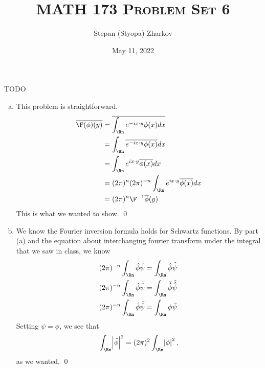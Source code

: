 \documentclass{article}
\title{\textsc{MATH 173 Problem Set 6}}
\author{Stepan (Styopa) Zharkov}
\date{May 11, 2022}
\begin{document}
\maketitle
{} TODO
 \tri
\hop 
\solution
\begin{enumerate}[(a)]
    \item This problem is straightforward. 
    \begin{align*}
        \ol{\F(\phi)(y)} &= \ol {\int_\Rn e^{-ix \cdot y}\phi(x)dx} \\
        &= \int_\Rn \ol {e^{-ix \cdot y}\phi(x)}dx \\
        &= \int_\Rn e^{ix \cdot y}\ol{\phi(x)}dx \\
        &= (2\pi)^n(2\pi)^{-n}\int_\Rn e^{ix \cdot y}\ol{\phi(x)}dx \\
        &= (2\pi)^n\F\inv\ol{\phi}(y) 
    \end{align*}
    This is what we wanted to show. \qed 
    \item We know the Fourier inversion formula holds for Schwartz functions. By part (a) and the equation about interchanging fourier transform under the integral that we saw in class, we know 
    \begin{align*}
        (2\pi)^{-n}\int_\Rn \hat{\phi}\bar{\hat{\psi}} &= \int_\Rn \hat{\phi}\check{\bar{\psi}}  \\
        (2\pi)^{-n}\int_\Rn \hat{\phi}\bar{\hat{\psi}} &= \int_\Rn \check{\hat{\phi}}\hat{\check{\bar{\psi}}}  \\
        (2\pi)^{-n}\int_\Rn \hat{\phi}\bar{\hat{\psi}} &= \int_\Rn \phi\bar{\psi}.
    \end{align*}
    Setting $\psi = \phi$, we see that 
    \begin{align*}
        \int_\Rn \abs{\hat{\phi}}^2 = (2\pi)^2\int_\Rn \abs{{\phi}}^2,
    \end{align*}
    as we wanted. \qed
\end{enumerate}
\end{document}
